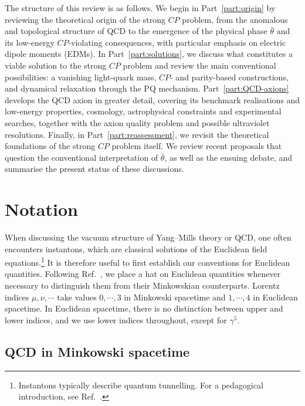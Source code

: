 \documentclass[review]{elsarticle}
\numberwithin{equation}{section}
\numberwithin{table}{section}
\numberwithin{figure}{section}
\begin{document}
The structure of this review is as follows. We begin in Part~\ref{part:origin} by reviewing the theoretical origin of the strong $CP$ problem, from the anomalous and topological structure of QCD to the emergence of the physical phase $\bar\theta$ and its low-energy $CP$-violating consequences, with particular emphasis on electric dipole moments (EDMs). In Part~\ref{part:solutions}, we discuss what constitutes a viable solution to the strong $CP$ problem and review the main conventional possibilities: a vanishing light-quark mass, $CP$- and parity-based constructions, and dynamical relaxation through the PQ mechanism. Part~\ref{part:QCD-axions} develops the QCD axion in greater detail, covering its benchmark realisations and low-energy properties, cosmology, astrophysical constraints and experimental searches, together with the axion quality problem and possible ultraviolet resolutions. Finally, in Part~\ref{part:reassessment}, we revisit the theoretical foundations of the strong $CP$ problem itself. We review recent proposals that question the conventional interpretation of $\bar\theta$, as well as the ensuing debate, and summarise the present status of these discussions.




\section{Notation}
\label{sec:notation}

When discussing the vacuum structure of Yang--Mills theory or QCD, one often encounters instantons, which are classical solutions of the Euclidean field equations.\footnote{Instantons typically describe quantum tunnelling. For a pedagogical introduction, see Ref.~\cite{Coleman:1985rnk}.} It is therefore useful to first establish our conventions for Euclidean quantities. Following Ref.~\cite{Vainshtein:1981wh}, we place a hat on Euclidean quantities whenever necessary to distinguish them from their Minkowskian counterparts. Lorentz indices $\mu,\nu,\cdots$ take values $0,\cdots,3$ in Minkowski spacetime and $1,\cdots,4$ in Euclidean spacetime. In Euclidean spacetime, there is no distinction between upper and lower indices, and we use lower indices throughout, except for $\gamma^5$.


\subsection{QCD in Minkowski spacetime}
\end{document}
